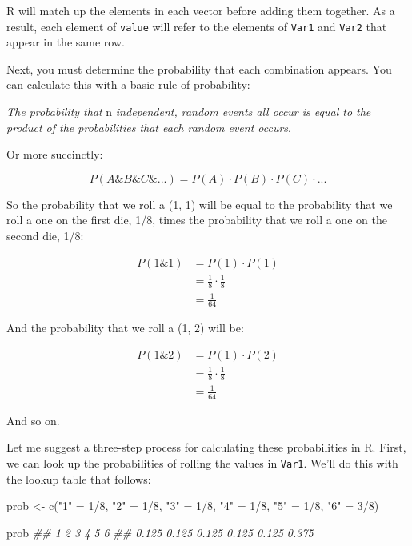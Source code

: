 \documentclass[
  letterpaper,
  DIV=11,
  numbers=noendperiod]{scrbook}
\newenvironment{Shaded}{\begin{snugshade}}{\end{snugshade}}
\newcommand{\DecValTok}[1]{\textcolor[rgb]{0.68,0.00,0.00}{#1}}
\newcommand{\DocumentationTok}[1]{\textcolor[rgb]{0.37,0.37,0.37}{\textit{#1}}}
\newcommand{\FunctionTok}[1]{\textcolor[rgb]{0.28,0.35,0.67}{#1}}
\newcommand{\NormalTok}[1]{\textcolor[rgb]{0.00,0.23,0.31}{#1}}
\newcommand{\OtherTok}[1]{\textcolor[rgb]{0.00,0.23,0.31}{#1}}
\newcommand{\SpecialCharTok}[1]{\textcolor[rgb]{0.37,0.37,0.37}{#1}}
\newcommand{\StringTok}[1]{\textcolor[rgb]{0.13,0.47,0.30}{#1}}
\begin{document}
R will match up the elements in each vector before adding them together.
As a result, each element of \texttt{value} will refer to the elements
of \texttt{Var1} and \texttt{Var2} that appear in the same row.

Next, you must determine the probability that each combination appears.
You can calculate this with a basic rule of probability:

\emph{The probability that} n \emph{independent, random events all occur
is equal to the product of the probabilities that each random event
occurs}.

Or more succinctly:

\[
P(A \& B \& C \& ...) = P(A) \cdot P(B) \cdot P(C) \cdot ...
\]

So the probability that we roll a (1, 1) will be equal to the
probability that we roll a one on the first die, 1/8, times the
probability that we roll a one on the second die, 1/8:

\[
\begin{array}{rl}
P(1 \& 1) & = P(1) \cdot P(1) \\
& = \frac{1}{8} \cdot \frac{1}{8}\\
& = \frac{1}{64}
\end{array}
\]

And the probability that we roll a (1, 2) will be:

\[
\begin{array}{rl}
P(1 \& 2) & = P(1) \cdot P(2) \\
& = \frac{1}{8} \cdot \frac{1}{8}\\
& = \frac{1}{64}
\end{array}
\]

And so on.

Let me suggest a three-step process for calculating these probabilities
in R. First, we can look up the probabilities of rolling the values in
\texttt{Var1}. We'll do this with the lookup table that follows:

\begin{Shaded}
\begin{Highlighting}[]
\NormalTok{prob }\OtherTok{\textless{}{-}} \FunctionTok{c}\NormalTok{(}\StringTok{"1"} \OtherTok{=} \DecValTok{1}\SpecialCharTok{/}\DecValTok{8}\NormalTok{, }\StringTok{"2"} \OtherTok{=} \DecValTok{1}\SpecialCharTok{/}\DecValTok{8}\NormalTok{, }\StringTok{"3"} \OtherTok{=} \DecValTok{1}\SpecialCharTok{/}\DecValTok{8}\NormalTok{, }\StringTok{"4"} \OtherTok{=} \DecValTok{1}\SpecialCharTok{/}\DecValTok{8}\NormalTok{, }\StringTok{"5"} \OtherTok{=} \DecValTok{1}\SpecialCharTok{/}\DecValTok{8}\NormalTok{, }\StringTok{"6"} \OtherTok{=} \DecValTok{3}\SpecialCharTok{/}\DecValTok{8}\NormalTok{)}

\NormalTok{prob}
\DocumentationTok{\#\#     1     2     3     4     5     6 }
\DocumentationTok{\#\# 0.125 0.125 0.125 0.125 0.125 0.375 }
\end{Highlighting}
\end{Shaded}
\end{document}
